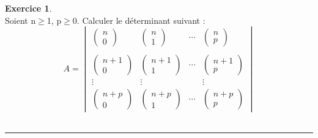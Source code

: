 \documentclass[a4paper,10pt]{article}
\theoremstyle{definition}
\theoremstyle{definition}
\newtheorem{exo}{Exercice}
\newcommand{\p}{\mathbb{P}}
\begin{document}
		\begin{exo}\quad\\[0.25cm]
			Soient n$\geq$1, p$\geq$0. Calculer le déterminant suivant :\\[0.4cm] 
			$$ A = \begin{vmatrix}
			\begin{pmatrix}
			n\\0
			\end{pmatrix} & \begin{pmatrix}
			n\\1
			\end{pmatrix} & \cdots & \begin{pmatrix}
			n\\p
			\end{pmatrix} \\\\
			\begin{pmatrix}
			n+1\\0
			\end{pmatrix} & \begin{pmatrix}
			n+1\\1
			\end{pmatrix} &\cdots & \begin{pmatrix}
			n+1\\p
			\end{pmatrix} \\[0.2cm]
			\vdots  &\vdots &  & \vdots \\[0.2cm]
			
			\begin{pmatrix}
				n+p\\0
			\end{pmatrix} & \begin{pmatrix}
				n+p\\1
			\end{pmatrix} &\cdots & \begin{pmatrix}
				n+p\\p
			\end{pmatrix}
		\end{vmatrix}$$
		\\[0.2cm]
		\centering
		\rule{1\linewidth}{0.6pt}
		\end{exo}
		
\end{document}
